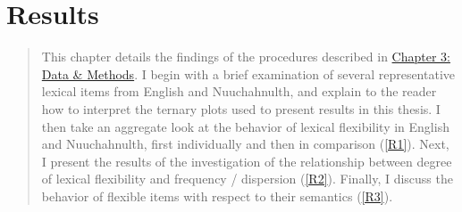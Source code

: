 \chapter{Results}
\label{ch:results}

\blockquote{This chapter details the findings of the procedures described in \hyperref[ch:3-methods]{Chapter 3: Data \& Methods}. I begin with a brief examination of several representative lexical items from English and Nuuchahnulth, and explain to the reader how to interpret the ternary plots used to present results in this thesis. I then take an aggregate look at the behavior of lexical flexibility in English and Nuuchahnulth, first individually and then in comparison (\ref{R1}). Next, I present the results of the investigation of the relationship between degree of lexical flexibility and frequency / dispersion (\ref{R2}). Finally, I discuss the behavior of flexible items with respect to their semantics (\ref{R3}).}
